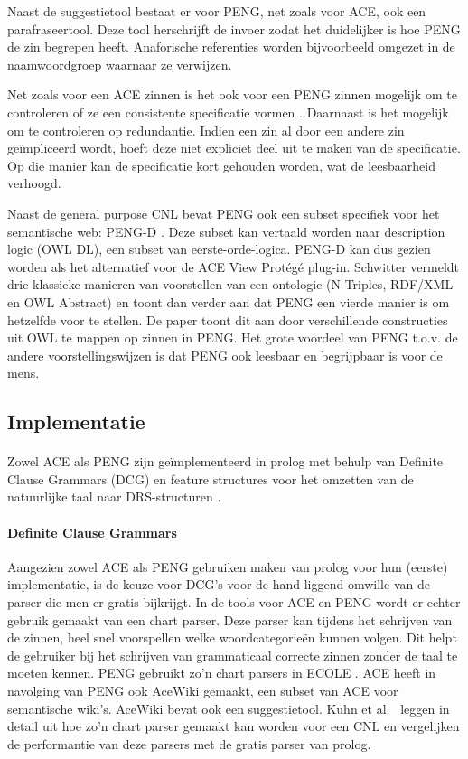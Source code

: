 Naast de suggestietool bestaat er voor PENG, net zoals voor ACE, ook een parafraseertool. Deze tool herschrijft de invoer zodat het duidelijker is hoe PENG de zin begrepen heeft. Anaforische referenties worden bijvoorbeeld omgezet in de naamwoordgroep waarnaar ze verwijzen.

Net zoals voor een ACE zinnen is het ook voor een PENG zinnen mogelijk om te controleren of ze een consistente specificatie vormen \cite{Schwitter2004b}. Daarnaast is het mogelijk om te controleren op redundantie. Indien een zin al door een andere zin ge\"impliceerd wordt, hoeft deze niet expliciet deel uit te maken van de specificatie. Op die manier kan de specificatie kort gehouden worden, wat de leesbaarheid verhoogd.

Naast de general purpose CNL bevat PENG ook een subset specifiek voor het semantische web: PENG-D \cite{Schwitter2004}. Deze subset kan vertaald worden naar description logic (OWL DL), een subset van eerste-orde-logica. PENG-D kan dus gezien worden als het alternatief voor de ACE View Prot\'eg\'e plug-in.
Schwitter \cite{Schwitter2006} vermeldt drie klassieke manieren van voorstellen van een ontologie (N-Triples, RDF/XML en OWL Abstract) en toont dan verder aan dat PENG een vierde manier is om hetzelfde voor te stellen. De paper toont dit aan door verschillende constructies uit OWL te mappen op zinnen in PENG. Het grote voordeel van PENG t.o.v. de andere voorstellingswijzen is dat PENG ook leesbaar en begrijpbaar is voor de mens.

\subsection{Implementatie}
\paragraph{} Zowel ACE als PENG zijn ge\"implementeerd in prolog met behulp van Definite Clause Grammars (DCG) en feature structures voor het omzetten van de natuurlijke taal naar DRS-structuren \cite{Fuchs2008, Schwitter2006}.

\paragraph{Definite Clause Grammars} Aangezien zowel ACE als PENG gebruiken maken van prolog voor hun (eerste) implementatie, is de keuze voor DCG's voor de hand liggend omwille van de parser die men er gratis bijkrijgt. In de tools voor ACE en PENG wordt er echter gebruik gemaakt van een chart parser. Deze parser kan tijdens het schrijven van de zinnen, heel snel voorspellen welke woordcategorie\"en kunnen volgen. Dit helpt de gebruiker bij het schrijven van grammaticaal correcte zinnen zonder de taal te moeten kennen. PENG gebruikt zo'n chart parsers in ECOLE \cite{Schwitter2003}. ACE heeft in navolging van PENG ook AceWiki \cite{Kuhn2008} gemaakt, een subset van ACE voor semantische wiki's. AceWiki bevat ook een suggestietool. Kuhn et al.\ \cite{Kuhn2008} leggen in detail uit hoe zo'n chart parser gemaakt kan worden voor een CNL en vergelijken de performantie van deze parsers met de gratis parser van prolog.

